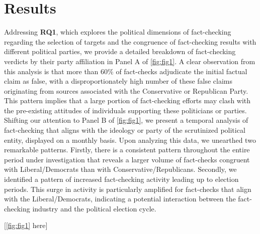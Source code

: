 \documentclass[
  12pt,
]{article}
\begin{document}
\hypertarget{results}{%
\section{Results}\label{results}}

Addressing \textbf{RQ1}, which explores the political dimensions of
fact-checking regarding the selection of targets and the congruence of
fact-checking results with different political parties, we provide a
detailed breakdown of fact-checking verdicts by their party affiliation
in Panel A of \autoref{fig:fig1}. A clear observation from this analysis
is that more than 60\% of fact-checks adjudicate the initial factual
claim as false, with a disproportionately high number of these false
claims originating from sources associated with the Conservative or
Republican Party. This pattern implies that a large portion of
fact-checking efforts may clash with the pre-existing attitudes of
individuals supporting these politicians or parties. Shifting our
attention to Panel B of \autoref{fig:fig1}, we present a temporal
analysis of fact-checking that aligns with the ideology or party of the
scrutinized political entity, displayed on a monthly basis. Upon
analyzing this data, we unearthed two remarkable patterns. Firstly,
there is a consistent pattern throughout the entire period under
investigation that reveals a larger volume of fact-checks congruent with
Liberal/Democrats than with Conservative/Republicans. Secondly, we
identified a pattern of increased fact-checking activity leading up to
election periods. This surge in activity is particularly amplified for
fact-checks that align with the Liberal/Democrats, indicating a
potential interaction between the fact-checking industry and the
political election cycle.

\begin{center}
[\autoref{fig:fig1} here]
\end{center}
\end{document}
